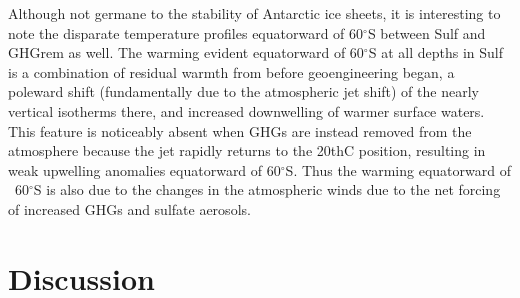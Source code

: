 \documentclass{nature}
\begin{document}
Although not germane to the stability of Antarctic ice sheets, it is interesting to note the disparate temperature profiles equatorward of 60$^\circ$S between Sulf and GHGrem as well. The warming evident equatorward of 60$^\circ$S at all depths in Sulf is a combination of residual warmth from before geoengineering began, a poleward shift (fundamentally due to the atmospheric jet shift) of the nearly vertical isotherms there, and increased downwelling of warmer surface waters. This feature is noticeably absent when GHGs are instead removed from the atmosphere because the jet rapidly returns to the 20thC position, resulting in weak upwelling anomalies equatorward of 60$^\circ$S. Thus the warming equatorward of ~60$^\circ$S is also due to the changes in the atmospheric winds due to the net forcing of increased GHGs and sulfate aerosols.


\section{Discussion}
\end{document}
